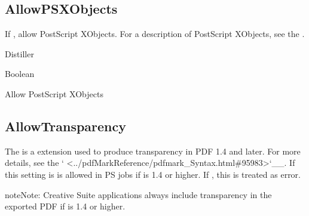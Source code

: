 \documentclass[letterpaper,12pt,english,openany,oneside]{sphinxmanual}
\begin{document}
\subsection{AllowPSXObjects}
\label{\detokenize{PDF_Create_CommonSettings:allowpsxobjects}}
If  , allow PostScript XObjects. For a description of PostScript XObjects, see the  .

\label{\detokenize{PDF_Create_CommonSettings:supported-by-86}}

Distiller

\label{\detokenize{PDF_Create_CommonSettings:type-85}}

Boolean

\label{\detokenize{PDF_Create_CommonSettings:ui-name-71}}

Allow PostScript XObjects

\label{\detokenize{PDF_Create_CommonSettings:default-value-80}}

\begin{sphinxVerbatim}[commandchars=\\\{\}]
\end{sphinxVerbatim}




\subsection{AllowTransparency}
\label{\detokenize{PDF_Create_CommonSettings:allowtransparency}}
The  is a  extension used to produce transparency in PDF 1.4 and later. For more details, see the ` <../pdfMarkReference/pdfmark\_Syntax.html\#95983>`\_\_. If this setting is \sphinxcode{\sphinxupquote{true, {[}... /SetTransparency pdfmark}} is allowed in PS jobs if  is 1.4 or higher. If  , this  is treated as error.

\begin{sphinxadmonition}{note}{Note:}
Creative Suite applications always include transparency in the exported PDF if  is 1.4 or higher.
\end{sphinxadmonition}
\label{\detokenize{PDF_Create_CommonSettings:supported-by-87}}
\end{document}
